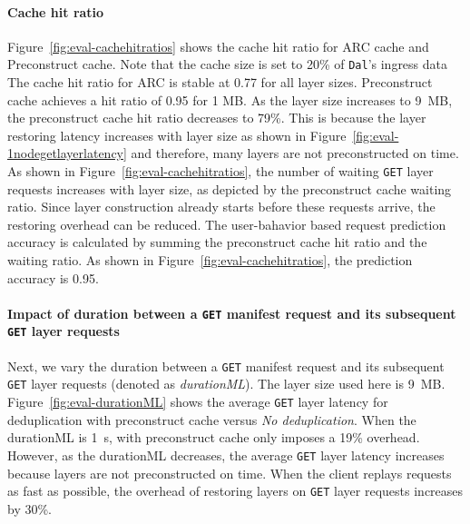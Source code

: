 \paragraph{Cache hit ratio}
Figure~\ref{fig:eval-cachehitratios} shows the cache hit ratio for ARC cache 
and Preconstruct cache.
Note that the cache size is set to 20\% of \texttt{Dal}'s ingress data 
The cache hit ratio for ARC is stable at 0.77 for all layer sizes.
Preconstruct cache achieves a hit ratio of 0.95 for 1 MB.
As the layer size increases to 9~MB, the preconstruct cache hit ratio decreases to 79\%. 
This is because the layer restoring latency increases with layer size as shown in Figure~\ref{fig:eval-1nodegetlayerlatency} and therefore, 
many layers are not preconstructed on time.
As shown in Figure~\ref{fig:eval-cachehitratios}, 
the number of waiting \texttt{GET} layer requests increases with layer size, as depicted by the preconstruct cache waiting ratio.
Since layer construction already starts before these requests arrive, the restoring overhead can be reduced.
The user-bahavior based request prediction accuracy is calculated by summing the preconstruct cache hit ratio and the waiting ratio.
As shown in Figure~\ref{fig:eval-cachehitratios}, the prediction accuracy is 0.95.
 
\paragraph{Impact of duration between a \texttt{GET} manifest request and its subsequent \texttt{GET} layer requests}
Next, we vary the duration between a \texttt{GET} manifest request and its subsequent \texttt{GET} layer requests (denoted as \emph{durationML}).
The layer size used here is 9~MB.
%
Figure~\ref{fig:eval-durationML} shows the average \texttt{GET} layer latency for \sysname deduplication with preconstruct cache versus \emph{No deduplication}.
When the durationML is 1~s, \sysname with preconstruct cache only imposes a 19\% overhead.
However, as the durationML decreases, the average \texttt{GET} layer latency increases because layers are not preconstructed on time.
When the client replays requests as fast as possible, the overhead of restoring layers on \texttt{GET} layer requests increases by 30\%.


